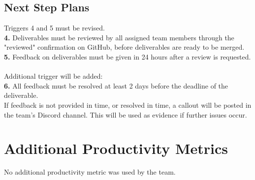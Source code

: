 \documentclass{article}
\begin{document}
\subsection{Next Step Plans}
Triggers 4 and 5 must be revised. \\
\textbf{4.} Deliverables must be reviewed by all assigned team members through the "reviewed" confirmation on GitHub, before deliverables are ready to be merged. \\
\textbf{5.} Feedback on deliverables must be given in 24 hours after a review is requested.
\\\\
Additional trigger will be added:\\
\textbf{6.} All feedback must be resolved at least 2 days before the deadline of the deliverable.\\
If feedback is not provided in time, or resolved in time, a callout will be posted in the team's Discord channel. This will be used as evidence if further issues occur.
\section{Additional Productivity Metrics}
No additional productivity metric was used by the team.
\end{document}
